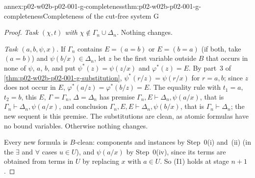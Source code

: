 \begin{annexitem}{annex:p02-w02b-p02-001-g-completeness}{thm:p02-w02b-p02-001-g-completeness}{Completeness of the cut-free system G}
\begin{proof}
\emph{Task \((\chi,t)\) with \(\chi\notin\Gamma_n\cup\Delta_n\).}  Nothing
changes.

\emph{Task \((a,b,\psi,x)\).}  If \(\Gamma_n\) contains
\(E=(a=b)\) or \(E=(b=a)\) (if both, take \((a=b)\)) and
\(\psi(b/x)\in\Delta_n\), let \(z\) be the first variable outside \(B\)
that occurs in none of \(\psi\), \(a\), \(b\), and put
\(\psi^{*}(z)=\psi(z/x)\) and \(\varphi^{*}(z)=E\).  By part~3 of
\cref{thm:p02-w02b-p02-001-g-substitution}, \(\psi^{*}(r/z)=\psi(r/x)\) for
\(r=a,b\); since \(z\) does not occur in \(E\),
\(\varphi^{*}(a/z)=\varphi^{*}(b/z)=E\).  The equality rule with
\(t_1=a\), \(t_2=b\), this \(E\), \(\Gamma=\Gamma_n\), \(\Delta=\Delta_n\)
has premise \(\Gamma_n,E\vdash\Delta_n,\psi(a/x)\), that is
\(\Gamma_n\vdash\Delta_n,\psi(a/x)\), and conclusion
\(\Gamma_n,E,E\vdash\Delta_n,\psi(b/x)\), that is
\(\Gamma_n\vdash\Delta_n\); the new sequent is this premise.  The
substitutions are clean, as atomic formulas have no bound variables.
Otherwise nothing changes.

Every new formula is \(B\)-clean: components and instances by Step~0(i)
and~(ii) (in the \(\exists\) and \(\forall\) cases \(u\in U\)), and
\(\psi(a/x)\) by Step~0(iv), since its terms are obtained from terms in
\(U\) by replacing \(x\) with \(a\in U\).  So (I1) holds at stage \(n+1\).


\end{proof}
\end{annexitem}
